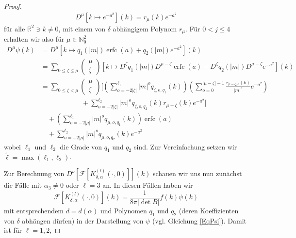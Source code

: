 \documentclass[12pt,a4paper]{scrartcl}
\numberwithin{equation}{section}
\newcommand{\R}{\mathbb{R}} %
\newcommand{\N}{\mathbb{N}} %
\newcommand{\F}{\mathcal{F}} %
\newcommand{\erfc}{\operatorname{erfc}}
\begin{document}
\begin{proof}
\begin{align}
D^\mu [k \mapsto e^{-a^2}](k)= r_{\mu}(k) e^{-a^2}
\end{align}
für alle $\R^2 \ni k \neq 0$, mit einem von $\delta$ abhängigem Polynom $r_{\mu}$.
Für $0<j\leq 4$ erhalten wir also für $\mu\in \N_0^2$
\begin{align*}
D^\mu \psi(k) 
&=D^\mu [ k \mapsto q_1(|m|)\erfc(a)+q_2(|m|)e^{-a^2}](k) \\
&=\sum_{0 \leq \zeta \leq \mu} 
\begin{pmatrix}
\mu \\ \zeta 
\end{pmatrix} \left[k \mapsto
D^{\zeta} q_1(|m|) D^{\mu-\zeta} \erfc(a) + D^{\zeta} q_2(|m|) D^{\mu-\zeta} e^{-a^2} \right](k) \\
&= \sum_{0 \leq \zeta < \mu} 
\begin{pmatrix}
\mu \\ \zeta 
\end{pmatrix} \bigg[\left(\sum_{o=-2|\zeta|}^{\ell_1} |m|^o q_{\zeta,o,q_1}(k)\right) \left(\sum_{o=0}^{|\mu-\zeta|-1} \frac{r_{\mu-\zeta,o}(k)}{|m|^o} e^{-a^2}\right) \\
& \qquad \qquad \qquad  +
\sum_{o=-2|\zeta|}^{\ell_2} |m|^o q_{\zeta,o,q_2}(k) r_{\mu-\zeta}(k) e^{-a^2}
 \bigg] \\
 & \quad + \left(\sum_{o=-2|\mu|}^{\ell_1} |m|^o q_{\mu,o,q_1}(k)\right) \erfc(a) \\
& \quad  +
\sum_{o=-2|\mu|}^{\ell_2} |m|^o q_{\mu,o,q_2}(k) e^{-a^2}
\end{align*}
wobei $\ell_1$ und $\ell_2$ die Grade von $q_1$ und $q_2$ sind. Zur Vereinfachung setzen wir $\tilde \ell=\max(\ell_1,\ell_2)$.
%

Zur Berechnung von $D^\nu \left[ \F[ K_{\delta,\alpha}^{(l)}(\cdot,0)] \right](k)$ schauen wir uns nun zunächst die Fälle mit $\alpha_3 \neq 0$ oder $\ell=3$ an. In diesen Fällen haben wir
\[
\F[ K_{\delta,\alpha}^{(l)}(\cdot,0)](k)= \frac{1}{8 \pi |\det B|} f(k) \psi(k)
\] 
mit entsprechendem $d=d(\alpha)$ und Polynomen $q_1$ und $q_2$ (deren Koeffizienten von $\delta$ abhängen dürfen) in der Darstellung von $\psi$ (vgl. Gleichung \eqref{EqPsi}). Damit ist für $\ell=1,2$,


\end{proof}
\end{document}
